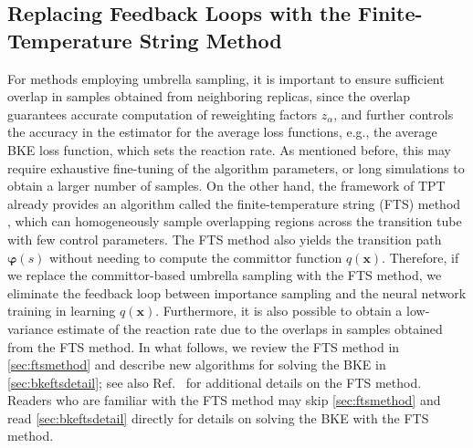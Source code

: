 \documentclass{article}
\numberwithin{equation}{section}
\def\*#1{\mathbf{#1}}
\theoremstyle{definition}
\theoremstyle{remark}
\def\varphib{\boldsymbol{\varphi}}
\begin{document}
\subsection{Replacing Feedback Loops with the Finite-Temperature String Method} \label{sec:basefts}
For methods employing umbrella sampling, it is important to ensure sufficient overlap in samples obtained from neighboring replicas, since the overlap guarantees accurate computation of reweighting factors $z_\alpha$, and further controls the accuracy in the estimator for the average loss functions, e.g., the average BKE loss function, which sets the reaction rate.
As mentioned before, this may require exhaustive fine-tuning of the algorithm parameters, or long simulations to obtain a larger number of samples. 
On the other hand, the framework of TPT already provides an algorithm called the finite-temperature string (FTS) method \cite{weinan2005finite,vanden2009revisiting}, which can homogeneously sample overlapping regions across the transition tube with few control parameters. 
The FTS method also yields the transition path $\varphib(s)$ without needing to compute the committor function $q(\*x)$. 
Therefore, if we replace the committor-based umbrella sampling with the FTS method, we eliminate the feedback loop between importance sampling and the neural network training in learning $q(\* x)$. Furthermore, it is also possible to obtain a low-variance estimate of the reaction rate due to the overlaps in samples obtained from the FTS method.
In what follows, we review the FTS method in \cref{sec:ftsmethod} and describe new algorithms for solving the BKE in \cref{sec:bkeftsdetail}; see also Ref.~\cite{vanden2009revisiting} for additional details on the FTS method. 
Readers who are familiar with the FTS method may skip \cref{sec:ftsmethod} and read \cref{sec:bkeftsdetail} directly for details on solving the BKE with the FTS method.
\end{document}
